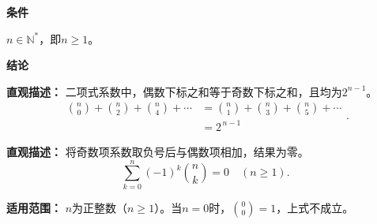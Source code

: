 \begin{statementbox}
	\textbf{\textcolor{CStatement}{条件}}
	\begin{description}[style=nextline, leftmargin=2.8em, labelsep=0.5em, itemsep=0.35em]
		\item[\textbf{\textcolor{CStatement}{条件1（正整数）：}}]
			$n\in\mathbb{N}^*$，即$n\ge 1$。
	\end{description}
	\textbf{\textcolor{CStatement}{结论}}
	\begin{description}[style=nextline, leftmargin=2.8em, labelsep=0.5em, itemsep=0.45em]
		\item[\textbf{\textcolor{CStatement}{结论一（奇偶和相等）：}}]
			\textbf{\textcolor{CStatement}{直观描述：}}
			二项式系数中，偶数下标之和等于奇数下标之和，且均为$2^{n-1}$。
			\[
				\boxed{
				\begin{aligned}
					\binom{n}{0}+\binom{n}{2}+\binom{n}{4}+\cdots &= \binom{n}{1}+\binom{n}{3}+\binom{n}{5}+\cdots \\ &= 2^{\,n-1}
			\end{aligned}
				}.
			\]
		\item[\textbf{\textcolor{CStatement}{推广结论（交替和为零）：}}]
			\textbf{\textcolor{CStatement}{直观描述：}}
			将奇数项系数取负号后与偶数项相加，结果为零。
			\[
				\sum_{k=0}^{n}(-1)^k\binom{n}{k}=0\quad (n\ge 1).
			\]
	\end{description}
	\textbf{\textcolor{CStatement}{适用范围：}}
	$n$为正整数（$n\ge 1$）。当$n=0$时，$\binom{0}{0}=1$，上式不成立。
\end{statementbox}
